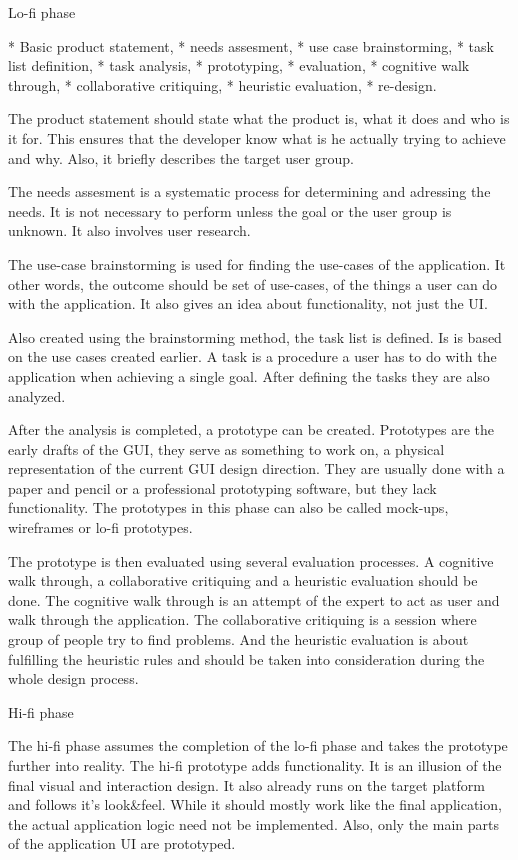 \seccc Lo-fi phase

\begitems
* Basic product statement,
* needs assesment,
* use case brainstorming,
* task list definition,
* task analysis,
* prototyping,
* evaluation,
\begitems
  * cognitive walk through,
  * collaborative critiquing,
  * heuristic evaluation,
\enditems
* re-design.
\enditems

The product statement should state what the product is, what it does and who is it for. This ensures that the developer know what is he actually trying to achieve and why. Also, it briefly describes the target user group.

The needs assesment is a systematic process for determining and adressing the needs. It is not necessary to perform unless the goal or the user group is unknown. It also involves user research.

The use-case brainstorming is used for finding the use-cases of the application. It other words, the outcome should be set of use-cases, of the things a user can do with the application. It also gives an idea about functionality, not just the UI.

Also created using the brainstorming method, the task list is defined. Is is based on the use cases created earlier. A task is a procedure a user has to do with the application when achieving a single goal. After defining the tasks they are also analyzed.

After the analysis is completed, a prototype can be created. Prototypes are the early drafts of the GUI, they serve as something to work on, a physical representation of the current GUI design direction.  They are usually done with a paper and pencil or a professional prototyping software, but they lack functionality. The prototypes in this phase can also be called mock-ups, wireframes or lo-fi prototypes.

The prototype is then evaluated using several evaluation processes. A cognitive walk through, a collaborative critiquing and a heuristic evaluation should be done.  The cognitive walk through is an attempt of the expert to act as user and walk through the application. The collaborative critiquing is a session where group of people try to find problems. And the heuristic evaluation is about fulfilling the heuristic rules and should be taken into consideration during the whole design process.

\seccc Hi-fi phase

The hi-fi phase assumes the completion of the lo-fi phase and takes the prototype further into reality. The hi-fi prototype adds functionality. It is an illusion of the final visual and interaction design. It also already runs on the target platform and follows it's look\&feel. While it should mostly work like the final application, the actual application logic need not be implemented. Also, only the main parts of the application UI are prototyped.

